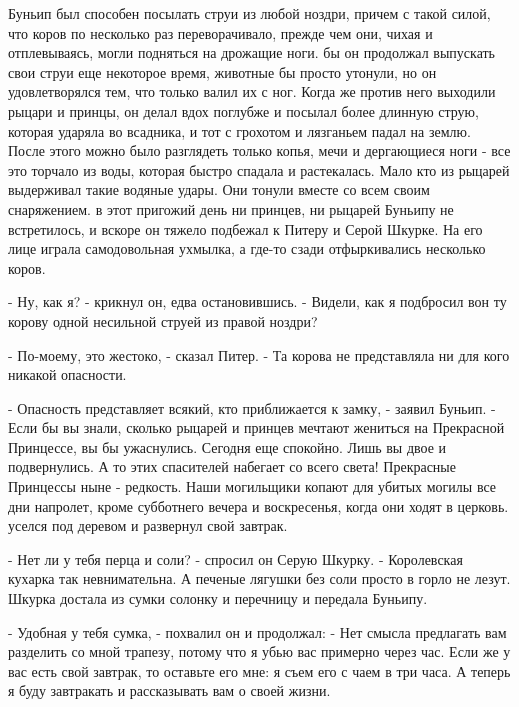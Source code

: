 Буньип был способен посылать струи из любой ноздри, причем с такой 
силой, что коров по несколько раз переворачивало, прежде чем они, 
чихая и отплевываясь, могли подняться на дрожащие ноги.
 бы он продолжал выпускать свои струи еще некоторое время, 
животные бы просто утонули, но он удовлетворялся тем, что только валил 
их с ног. Когда же против него выходили рыцари и принцы, он делал вдох 
поглубже и посылал более длинную струю, которая ударяла во всадника, и 
тот с грохотом и лязганьем падал на землю. После этого можно было 
разглядеть только копья, мечи и дергающиеся ноги - все это торчало из 
воды, которая быстро спадала и растекалась. Мало кто из рыцарей 
выдерживал такие водяные удары. Они тонули вместе со всем своим 
снаряжением.
 в этот пригожий день ни принцев, ни рыцарей Буньипу не 
встретилось, и вскоре он тяжело подбежал к Питеру и Серой Шкурке. На 
его лице играла самодовольная ухмылка, а где-то сзади отфыркивались 
несколько коров.
\par- Ну, как я? - крикнул он, едва остановившись. - Видели, как я 
подбросил вон ту корову одной несильной струей из правой ноздри?
\par- По-моему, это жестоко, - сказал Питер. - Та корова не 
представляла ни для кого никакой опасности.
\par- Опасность представляет всякий, кто приближается к замку, - 
заявил Буньип. - Если бы вы знали, сколько рыцарей и принцев мечтают 
жениться на Прекрасной Принцессе, вы бы ужаснулись. Сегодня еще 
спокойно. Лишь вы двое и подвернулись. А то этих спасителей набегает 
со всего света! Прекрасные Принцессы ныне - редкость. Наши могильщики 
копают для убитых могилы все дни напролет, кроме субботнего вечера и 
воскресенья, когда они ходят в церковь.
 уселся под деревом и развернул свой завтрак.
\par- Нет ли у тебя перца и соли? - спросил он Серую Шкурку. - 
Королевская кухарка так невнимательна. А печеные лягушки без соли 
просто в горло не лезут.
 Шкурка достала из сумки солонку и перечницу и передала 
Буньипу.
\par- Удобная у тебя сумка, - похвалил он и продолжал: - Нет смысла 
предлагать вам разделить со мной трапезу, потому что я убью вас 
примерно через час. Если же у вас есть свой завтрак, то оставьте его 
мне: я съем его с чаем в три часа. А теперь я буду завтракать и 
рассказывать вам о своей жизни.

